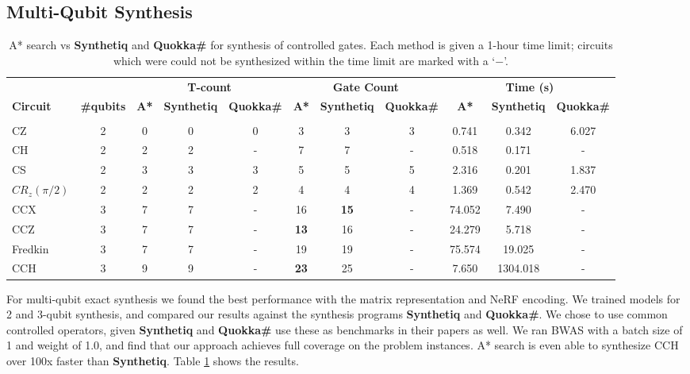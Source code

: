 \documentclass[letterpaper]{article} %
\begin{document}
\subsection{Multi-Qubit Synthesis}


\begin{table}[h!]
	\centering
	\begin{tabular}{lcccccccccc}
		\hline\noalign{\vskip 3pt}
		& & \multicolumn{3}{c}{\textbf{T-count}} & \multicolumn{3}{c}{\textbf{Gate Count}} & \multicolumn{3}{c}{\textbf{Time (s)}} \\
		\cmidrule(lr){3-5} \cmidrule(lr){6-8} \cmidrule(lr){9-11}
		\textbf{Circuit} & \textbf{\#qubits} & \textbf{A*} & \textbf{Synthetiq} & \textbf{Quokka\#} & \textbf{A*} & \textbf{Synthetiq} & \textbf{Quokka\#} & \textbf{A*} & \textbf{Synthetiq} & \textbf{Quokka\#} \\
		\hline\\[-6pt]
		CZ & 2 & 0 & 0 & 0 & 3 & 3 & 3 & 0.741 & 0.342 & 6.027 \\[3pt]
		CH & 2 & 2 & 2 & - & 7 & 7 & - & 0.518 & 0.171 & - \\[3pt]
		CS & 2 & 3 & 3 & 3 & 5 & 5 & 5 & 2.316 & 0.201 & 1.837 \\[3pt]
		$CR_z(\pi/2)$ & 2 & 2 & 2 & 2 & 4 & 4 & 4 & 1.369 & 0.542 & 2.470 \\[3pt]
		CCX & 3 & 7 & 7 & - & 16 & \textbf{15} & - & 74.052 & 7.490 & - \\[3pt]
		CCZ & 3 & 7 & 7 & - & \textbf{13} & 16 & - & 24.279 & 5.718 & - \\[3pt]
		Fredkin & 3 & 7 & 7 & - & 19 & 19 & - & 75.574 & 19.025 & - \\[3pt]
		CCH & 3 & 9 & 9 & - & \textbf{23} & 25 & - & 7.650 & 1304.018 & - \\[3pt]
		\hline
	\end{tabular}
	\caption{A* search vs \textbf{Synthetiq} and \textbf{Quokka\#} for synthesis of controlled gates. Each method is given a 1-hour time limit;
			 circuits which were could not be synthesized within the time limit are marked with a `$-$'.}
	\label{tab:multiqubit_benchmark}
\end{table}



For multi-qubit exact synthesis we found the best performance with the matrix representation and NeRF encoding.
We trained models for 2 and 3-qubit synthesis, and compared our results against the synthesis programs
\textbf{Synthetiq} and \textbf{Quokka\#}.
We chose to use common controlled operators, given \textbf{Synthetiq} and \textbf{Quokka\#} use these as benchmarks in their papers as well.
We ran BWAS with a batch size of 1 and weight of 1.0, and find that our approach achieves full coverage on the problem instances.
A* search is even able to synthesize CCH over 100x faster than \textbf{Synthetiq}.
Table \ref{tab:multiqubit_benchmark} shows the results.
\end{document}
